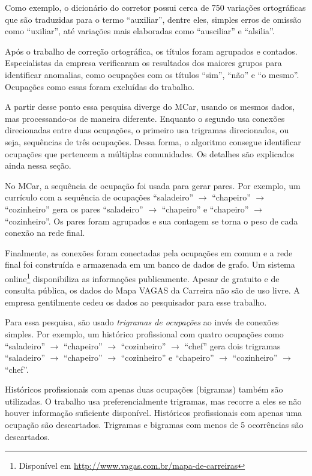\documentclass[
  article,
  11pt,
  a4paper,
  english,
  brazil,
  sumario=tradicional]{abntex2}
\begin{document}
Como exemplo, o dicionário do corretor possui cerca de 750 variações ortográficas que são traduzidas para o termo \enquote{auxiliar}, dentre eles, simples erros de omissão como \enquote{uxiliar}, até variações mais elaboradas como \enquote{ausciliar} e \enquote{alsilia}.

Após o trabalho de correção ortográfica, os títulos foram agrupados e contados. Especialistas da empresa verificaram os resultados dos maiores grupos para identificar anomalias, como ocupações com os títulos \enquote{sim}, \enquote{não} e \enquote{o mesmo}. Ocupações como essas foram excluídas do trabalho.

A partir desse ponto essa pesquisa diverge do MCar, usando os mesmos dados, mas processando-os de maneira diferente. Enquanto o segundo usa conexões direcionadas entre duas ocupações, o primeiro usa trigramas direcionados, ou seja, sequências de três ocupações.  Dessa forma, o algoritmo consegue identificar ocupações que pertencem a múltiplas comunidades. Os detalhes são explicados ainda nessa seção.

No MCar, a sequência de ocupação foi usada para gerar pares. Por exemplo, um currículo com a sequência de ocupações \enquote{saladeiro} $\to$ \enquote{chapeiro} $\to$ \enquote{cozinheiro} gera os pares \enquote{saladeiro} $\to$ \enquote{chapeiro} e \enquote{chapeiro} $\to$ \enquote{cozinheiro}. Os pares foram agrupados e sua contagem se torna o peso de cada conexão na rede final.

Finalmente, as conexões foram conectadas pela ocupações em comum e a rede final foi construída e armazenada em um banco de dados de grafo. Um sistema online\footnote{Disponível em \url{http://www.vagas.com.br/mapa-de-carreiras}} disponibiliza as informações publicamente. Apesar de gratuito e de consulta pública, os dados do Mapa VAGAS da Carreira não são de uso livre. A empresa gentilmente cedeu os dados ao pesquisador para esse trabalho.

Para essa pesquisa, são usado \textit{trigramas de ocupações} ao invés de conexões simples. Por exemplo, um histórico profissional com quatro ocupações como \enquote{saladeiro} $\to$ \enquote{chapeiro} $\to$ \enquote{cozinheiro} $\to$ \enquote{chef} gera dois trigramas \enquote{saladeiro} $\to$ \enquote{chapeiro} $\to$ \enquote{cozinheiro} e \enquote{chapeiro} $\to$ \enquote{cozinheiro} $\to$ \enquote{chef}. 

Históricos profissionais com apenas duas ocupações (bigramas) também são utilizadas. O trabalho usa preferencialmente trigramas, mas recorre a eles se não houver informação suficiente disponível. Históricos profissionais com apenas uma ocupação são descartados. Trigramas e bigramas com menos de 5 ocorrências são descartados.
\end{document}
